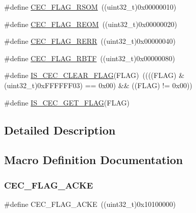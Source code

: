 \begin{DoxyCompactItemize}
\item 
\#define \hyperlink{group___c_e_c__flags__definition_ga4e352d4f48e3b197edf150860703d2bf}{C\+E\+C\+\_\+\+F\+L\+A\+G\+\_\+\+R\+S\+OM}~((uint32\+\_\+t)0x00000010)
\item 
\#define \hyperlink{group___c_e_c__flags__definition_gaffeaec4eafbf1efbd88139b9bb0654a7}{C\+E\+C\+\_\+\+F\+L\+A\+G\+\_\+\+R\+E\+OM}~((uint32\+\_\+t)0x00000020)
\item 
\#define \hyperlink{group___c_e_c__flags__definition_gac2376c2b958536ab414574f60cb5d75a}{C\+E\+C\+\_\+\+F\+L\+A\+G\+\_\+\+R\+E\+RR}~((uint32\+\_\+t)0x00000040)
\item 
\#define \hyperlink{group___c_e_c__flags__definition_gae73c6ec73ab8ad57b18d3bd416baf2d3}{C\+E\+C\+\_\+\+F\+L\+A\+G\+\_\+\+R\+B\+TF}~((uint32\+\_\+t)0x00000080)
\item 
\#define \hyperlink{group___c_e_c__flags__definition_ga418911667f82a12dd097f7fac7ad4e89}{I\+S\+\_\+\+C\+E\+C\+\_\+\+C\+L\+E\+A\+R\+\_\+\+F\+L\+AG}(F\+L\+AG)~((((F\+L\+AG) \& (uint32\+\_\+t)0x\+F\+F\+F\+F\+F\+F03) == 0x00) \&\& ((\+F\+L\+A\+G) != 0x00))
\item 
\#define \hyperlink{group___c_e_c__flags__definition_ga929b30d90f6807e9f72976596b0b850b}{I\+S\+\_\+\+C\+E\+C\+\_\+\+G\+E\+T\+\_\+\+F\+L\+AG}(F\+L\+AG)
\end{DoxyCompactItemize}


\subsection{Detailed Description}


\subsection{Macro Definition Documentation}
\mbox{\label{group___c_e_c__flags__definition_ga1583b7a221e54f2f19cb121bf310547c}} 
\subsubsection{\texorpdfstring{C\+E\+C\+\_\+\+F\+L\+A\+G\+\_\+\+A\+C\+KE}{CEC\_FLAG\_ACKE}}
{\footnotesize\ttfamily \#define C\+E\+C\+\_\+\+F\+L\+A\+G\+\_\+\+A\+C\+KE~((uint32\+\_\+t)0x10100000)}




